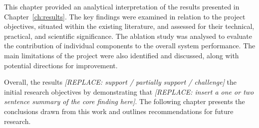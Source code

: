 This chapter provided an analytical interpretation of the results presented in
Chapter~\ref{ch:results}. The key findings were examined in relation to the
project objectives, situated within the existing literature, and assessed for
their technical, practical, and scientific significance. The ablation study was
analysed to evaluate the contribution of individual components to the overall
system performance. The main limitations of the project were also identified and
discussed, along with potential directions for improvement.

Overall, the results \textit{[REPLACE: support / partially support / challenge]}
the initial research objectives by demonstrating that \textit{[REPLACE: insert 
a one or two sentence summary of the core finding here]}. 
The following chapter presents the conclusions drawn from this work and outlines 
recommendations for future research.